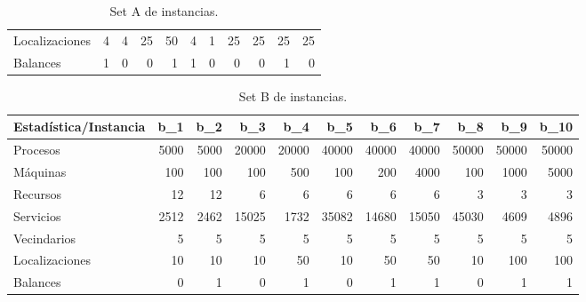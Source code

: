 \documentclass[../informe2.tex]{subfiles}
\begin{document}
\begin{table}[h]
\begin{tabular}{@{}lrrrrrrrrrr@{}}
		Localizaciones        & 4                         & 4                         & 25                        & 50                        & 4                         & 1                         & 25                        & 25                        & 25                        & 25                        \\
		Balances              & 1                         & 0                         & 0                         & 1                         & 1                         & 0                         & 0                         & 0                         & 1                         & 0                         \\ \bottomrule
	\end{tabular}
	\caption{\small Set A de instancias.}
	\label{table:set-a}
\end{table}

\begin{table}[h]
	\small
	\centering
	\begin{tabular}{@{}lrrrrrrrrrr@{}}
		\toprule
		Estadística/Instancia & b\_1 & b\_2 & b\_3  & b\_4  & b\_5  & b\_6  & b\_7  & b\_8  & b\_9  & b\_10 \\ \midrule
		Procesos              & 5000 & 5000 & 20000 & 20000 & 40000 & 40000 & 40000 & 50000 & 50000 & 50000 \\
		Máquinas              & 100  & 100  & 100   & 500   & 100   & 200   & 4000  & 100   & 1000  & 5000  \\
		Recursos              & 12   & 12   & 6     & 6     & 6     & 6     & 6     & 3     & 3     & 3     \\
		Servicios             & 2512 & 2462 & 15025 & 1732  & 35082 & 14680 & 15050 & 45030 & 4609  & 4896  \\
		Vecindarios           & 5    & 5    & 5     & 5     & 5     & 5     & 5     & 5     & 5     & 5     \\
		Localizaciones        & 10   & 10   & 10    & 50    & 10    & 50    & 50    & 10    & 100   & 100   \\
		Balances              & 0    & 1    & 0     & 1     & 0     & 1     & 1     & 0     & 1     & 1     \\ \bottomrule
	\end{tabular}
	\caption{\small Set B de instancias.}
	\label{table:set-b}
\end{table}
\end{document}
